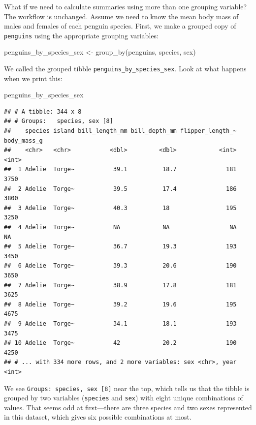 \documentclass[
]{book}
\newenvironment{Shaded}{\begin{snugshade}}{\end{snugshade}}
\newcommand{\FunctionTok}[1]{\textcolor[rgb]{0.00,0.00,0.00}{#1}}
\newcommand{\NormalTok}[1]{#1}
\newcommand{\OtherTok}[1]{\textcolor[rgb]{0.56,0.35,0.01}{#1}}
\begin{document}
What if we need to calculate summaries using more than one grouping variable? The workflow is unchanged. Assume we need to know the mean body mass of males and females of each penguin species. First, we make a grouped copy of \texttt{penguins} using the appropriate grouping variables:

\begin{Shaded}
\begin{Highlighting}[]
\NormalTok{penguins\_by\_species\_sex }\OtherTok{\textless{}{-}} \FunctionTok{group\_by}\NormalTok{(penguins, species, sex)}
\end{Highlighting}
\end{Shaded}

We called the grouped tibble \texttt{penguins\_by\_species\_sex}. Look at what happens when we print this:

\begin{Shaded}
\begin{Highlighting}[]
\NormalTok{penguins\_by\_species\_sex}
\end{Highlighting}
\end{Shaded}

\begin{verbatim}
## # A tibble: 344 x 8
## # Groups:   species, sex [8]
##    species island bill_length_mm bill_depth_mm flipper_length_~ body_mass_g
##    <chr>   <chr>           <dbl>         <dbl>            <int>       <int>
##  1 Adelie  Torge~           39.1          18.7              181        3750
##  2 Adelie  Torge~           39.5          17.4              186        3800
##  3 Adelie  Torge~           40.3          18                195        3250
##  4 Adelie  Torge~           NA            NA                 NA          NA
##  5 Adelie  Torge~           36.7          19.3              193        3450
##  6 Adelie  Torge~           39.3          20.6              190        3650
##  7 Adelie  Torge~           38.9          17.8              181        3625
##  8 Adelie  Torge~           39.2          19.6              195        4675
##  9 Adelie  Torge~           34.1          18.1              193        3475
## 10 Adelie  Torge~           42            20.2              190        4250
## # ... with 334 more rows, and 2 more variables: sex <chr>, year <int>
\end{verbatim}

We see \texttt{Groups:\ species,\ sex\ {[}8{]}} near the top, which tells us that the tibble is grouped by two variables (\texttt{species} and \texttt{sex}) with eight unique combinations of values. That seems odd at first---there are three species and two sexes represented in this dataset, which gives six possible combinations at most.
\end{document}
